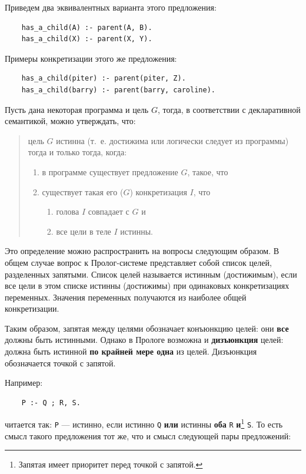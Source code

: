 \documentclass[12pt, openany, twoside]{book} %
\begin{document}
\noindent Приведем два эквивалентных варианта этого предложения:
{\tt\begin{verbatim}
    has_a_child(А) :- parent(А, В).
    has_a_child(X) :- parent(X, Y).
\end{verbatim}}

\noindent Примеры конкретизации этого же предложения:
{\tt\begin{verbatim}
    has_a_child(piter) :- parent(piter, Z).
    has_a_child(barry) :- parent(barry, caroline).
\end{verbatim}}

\noindent Пусть дана некоторая программа и цель $G$, тогда, в соответствии с декларативной семантикой, можно утверждать, что:

\begin{quote}
\noindent цель $G$ истинна (т.~е. достижима или логически следует из программы) тогда и только тогда, когда:
\begin{enumerate}
    \item[(1)] в программе существует предложение $G$, такое, что
    \item[(2)] существует такая его ($G$) конкретизация $I$, что
    \begin{enumerate}
        \item[(а)] голова $I$ совпадает с $G$ и
        \item[(б)] все цели в теле $I$ истинны.
    \end{enumerate}
\end{enumerate}
\end{quote}

Это определение можно распространить на вопросы следующим образом. В общем случае вопрос к Пролог-системе представляет собой список целей, разделенных запятыми. Список целей называется истинным (достижимым), если все цели в этом списке истинны (достижимы) при одинаковых конкретизациях переменных. Значения переменных получаются из наиболее общей конкретизации.

Таким образом, запятая между целями обозначает конъюнкцию целей: они \textbf{все} должны быть истинными. Однако в Прологе возможна и \textbf{дизъюнкция} целей: должна быть истинной \textbf{по крайней мере одна} из целей. Дизъюнкция обозначается точкой с запятой.

Например:
{\tt\begin{verbatim}
    Р :- Q ; R, S.
\end{verbatim}}
\noindent читается так: {\tt Р} --- истинно, если истинно {\tt Q} \textbf{или} истинны {\bf оба} {\tt R} {\bf и}\footnote{Запятая имеет приоритет перед точкой с запятой.} {\tt S}. То есть смысл такого предложения тот же, что и смысл следующей пары предложений:
\end{document}

